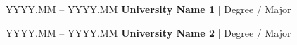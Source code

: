 \begin{twocolentry}{YYYY.MM -- YYYY.MM}
  \textbf{University Name 1} | Degree / Major
\end{twocolentry}

\entrysep

\begin{twocolentry}{YYYY.MM -- YYYY.MM}
  \textbf{University Name 2} | Degree / Major
\end{twocolentry}
